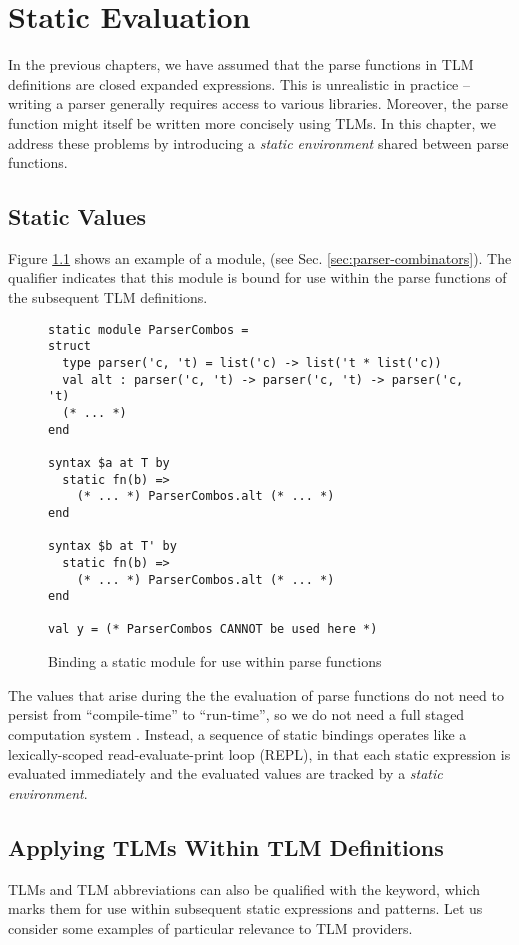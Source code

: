 \ificfp \else  
\chapter{Static Evaluation}\label{chap:static-eval}
In the previous chapters, we have assumed that the parse functions in TLM definitions are closed expanded expressions. This is unrealistic in practice -- writing a parser generally requires access to various libraries. Moreover, the parse function might itself be written more concisely using TLMs. In this chapter, we address these problems by introducing a \emph{static environment} shared between parse functions.

\section{Static Values}
Figure \ref{fig:static-module-example} shows an example of a module,  (see Sec. \ref{sec:parser-combinators}). The  qualifier indicates that this module is bound for use within the parse functions of the subsequent TLM definitions.
\begin{figure}[h]
\begin{lstlisting}
static module ParserCombos = 
struct 
  type parser('c, 't) = list('c) -> list('t * list('c))
  val alt : parser('c, 't) -> parser('c, 't) -> parser('c, 't)
  (* ... *)
end

syntax $a at T by 
  static fn(b) => 
  	(* ... *) ParserCombos.alt (* ... *)
end

syntax $b at T' by 
  static fn(b) => 
    (* ... *) ParserCombos.alt (* ... *)
end

val y = (* ParserCombos CANNOT be used here *)
\end{lstlisting}
\caption{Binding a static module for use within parse functions}
\label{fig:static-module-example}
\end{figure}
\clearpage

The values that arise during the the evaluation of parse functions do not need to persist from ``compile-time'' to ``run-time'', so we do not need a full staged computation system \cite{Taha99multi-stageprogramming:}. Instead, a sequence of static bindings operates like a lexically-scoped read-evaluate-print loop (REPL), in that each static expression is evaluated immediately and the evaluated values are tracked by a \emph{static environment}.


\section{Applying TLMs Within TLM Definitions}\label{sec:tsms-for-tsms}
TLMs and TLM abbreviations can also be qualified with the  keyword, which marks them for use within subsequent static expressions and patterns. Let us consider some examples of particular relevance to TLM providers.

